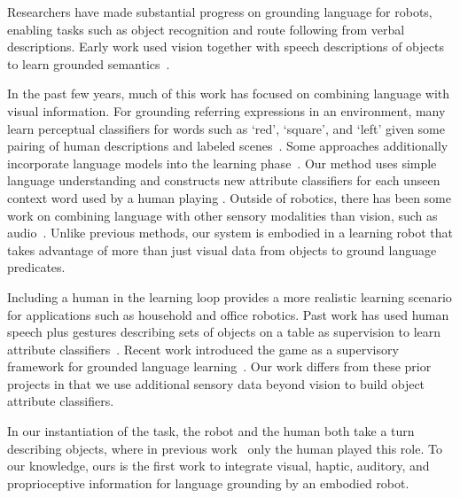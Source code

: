 Researchers have made substantial progress on grounding language for robots,
enabling tasks such as object recognition and route following from verbal
descriptions.  Early work used vision together with speech descriptions of
objects to learn grounded semantics~\cite{roy:cogsci02}.

In the past few years, much of this work has focused on combining language with
visual information.  For grounding referring expressions in an environment,
many learn perceptual classifiers for words such as `red', `square', and `left'
given some pairing of human descriptions and labeled
scenes~\cite{liu:acl14,malinowski:nips14,mohan:acs13,sun:icra13,dindo:iros10,vogel:aaai10}.
Some approaches additionally incorporate language models into the learning
phase~\cite{spranger:ijcai15,krishnamurthy:acl13,perera:aaai13,matuszek:icml12}.
Our method uses simple language understanding and constructs new attribute
classifiers for each unseen context word used by a human playing \ispy.
Outside of robotics, there has been some work on combining language with other
sensory modalities than vision, such as audio~\cite{kiela:emnlp15}.  Unlike
previous methods, our system is embodied in a learning robot that takes
advantage of more than just visual data from objects to ground language
predicates.

Including a human in the learning loop provides a more realistic learning
scenario for applications such as household and office robotics.  Past work has
used human speech plus gestures describing sets of objects on a table as
supervision to learn attribute classifiers~\cite{matuszek:aaai14,kollar:rss13}.
Recent work introduced the \ispy game as a supervisory framework for grounded
language learning~\cite{parde:ijcai15}.  Our work differs from these prior
projects in that we use additional sensory data beyond vision to build
object attribute classifiers.

In our instantiation of the \ispy task, the robot and the human both take a
turn describing objects, where in previous work~\cite{parde:ijcai15} only
the human played this role.  To our knowledge, ours is the first work to
integrate visual, haptic, auditory, and proprioceptive information for language
grounding by an embodied robot.

